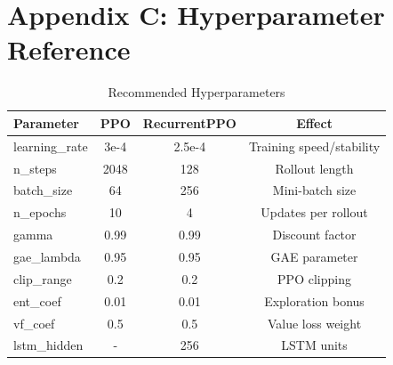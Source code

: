 \documentclass[12pt,a4paper]{article}
\begin{document}
\section*{Appendix C: Hyperparameter Reference}
\begin{table}[H]
\centering
\begin{tabular}{lccc}
\toprule
\textbf{Parameter} & \textbf{PPO} & \textbf{RecurrentPPO} & \textbf{Effect} \\
\midrule
learning\_rate & 3e-4 & 2.5e-4 & Training speed/stability \\
n\_steps & 2048 & 128 & Rollout length \\
batch\_size & 64 & 256 & Mini-batch size \\
n\_epochs & 10 & 4 & Updates per rollout \\
gamma & 0.99 & 0.99 & Discount factor \\
gae\_lambda & 0.95 & 0.95 & GAE parameter \\
clip\_range & 0.2 & 0.2 & PPO clipping \\
ent\_coef & 0.01 & 0.01 & Exploration bonus \\
vf\_coef & 0.5 & 0.5 & Value loss weight \\
lstm\_hidden & - & 256 & LSTM units \\
\bottomrule
\end{tabular}
\caption{Recommended Hyperparameters}
\label{tab:hyper_ref}
\end{table}
\end{document}
